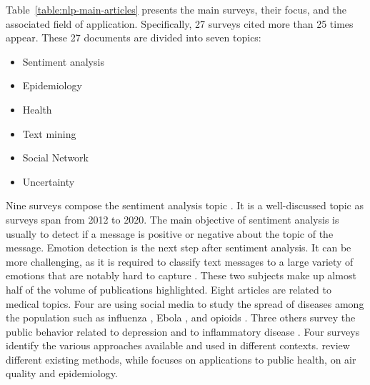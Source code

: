 Table~\ref{table:nlp-main-articles} presents the main surveys, their focus, and the associated field of application.
Specifically, 27 surveys cited more than 25 times appear.
These 27 documents are divided into seven topics:

\begin{itemize}
    \item Sentiment analysis
    \item Epidemiology
    \item Health
    \item Text mining
    \item Social Network
    \item Uncertainty
\end{itemize}

Nine surveys compose the sentiment analysis topic \parencite{yadavSentimentAnalysisUsing2020,hemmatianSurveyClassificationTechniques2019,chaturvediDistinguishingFactsOpinions2018,raviSurveyOpinionMining2015,chamlertwatDiscoveringConsumerInsight2012,liuSurveyOpinionMining2012,jiangAssessmentOnlinePublic2016,hawkinsMeasuringPatientperceivedQuality2016}.
It is a well-discussed topic as surveys span from 2012 to 2020.
The main objective of sentiment analysis is usually to detect if a message is positive or negative about the topic of the message.
Emotion detection is the next step after sentiment analysis.
It can be more challenging, as it is required to classify text messages to a large variety of emotions that are notably hard to capture \parencite{sailunazEmotionDetectionText2018,poriaReviewAffectiveComputing2017}.
These two subjects make up almost half of the volume of publications highlighted.
Eight articles are related to medical topics.
Four are using social media to study the spread of diseases among the population such as influenza \parencite{kagasheEnhancingSeasonalInfluenza2017,santillanaCombiningSearchSocial2015}, Ebola \parencite{odlumWhatCanWe2015}, and opioids \parencite{charyEpidemiologyTweetsEstimating2017}.
Three others survey the public behavior related to depression \parencite{yazdavarSemiSupervisedApproachMonitoring2017,khzamDomainspecificSoftwareLanguage2018} and to inflammatory disease \parencite{martinezPatientUnderstandingRisks2017}.
Four surveys identify the various approaches available and used in different contexts.
\textcite{salloumSurveyTextMining2017} review different existing methods, while \textcite{paulSocialMediaMining2016} focuses on applications to public health, \textcite{wangSocialMediaSensor2015} on air quality and \textcite{collierUncoveringTextMining2012} epidemiology.
